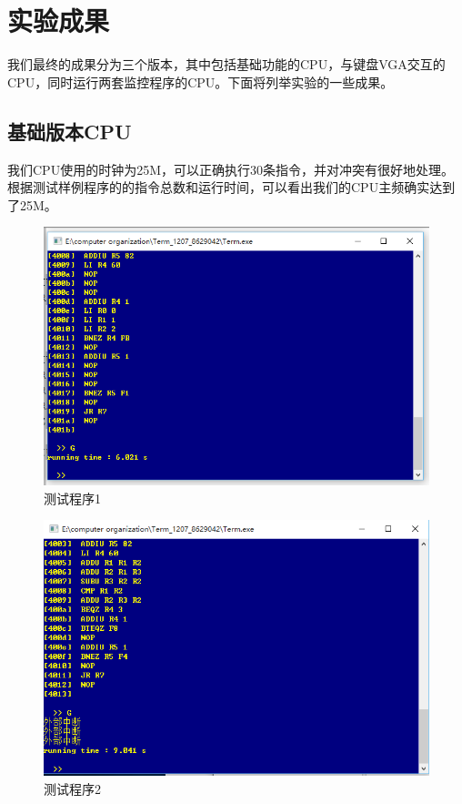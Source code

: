 
\chapter{实验成果} %

\label{Chapter5} %
我们最终的成果分为三个版本，其中包括基础功能的CPU，与键盘VGA交互的CPU，同时运行两套监控程序的CPU。下面将列举实验的一些成果。


\section{基础版本CPU}

我们CPU使用的时钟为25M，可以正确执行30条指令，并对冲突有很好地处理。根据测试样例程序的的指令总数和运行时间，可以看出我们的CPU主频确实达到了25M。

\begin{figure}[H]
  \centering
  \includegraphics[width=5in]{Figures/cpu1.png}
  \caption{测试程序1}
\end{figure}

\begin{figure}[H]
  \centering
  \includegraphics[width=5in]{Figures/cpu2.png}
  \caption{测试程序2}
\end{figure}

